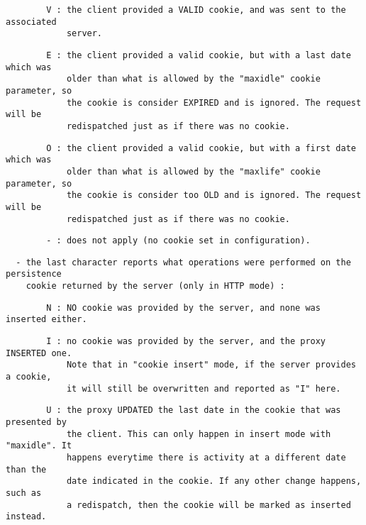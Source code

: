 \begin{verbatim}
        V : the client provided a VALID cookie, and was sent to the associated
            server.
\end{verbatim}

\begin{verbatim}
        E : the client provided a valid cookie, but with a last date which was
            older than what is allowed by the "maxidle" cookie parameter, so
            the cookie is consider EXPIRED and is ignored. The request will be
            redispatched just as if there was no cookie.
\end{verbatim}

\begin{verbatim}
        O : the client provided a valid cookie, but with a first date which was
            older than what is allowed by the "maxlife" cookie parameter, so
            the cookie is consider too OLD and is ignored. The request will be
            redispatched just as if there was no cookie.
\end{verbatim}

\begin{verbatim}
        - : does not apply (no cookie set in configuration).
\end{verbatim}

\begin{verbatim}
  - the last character reports what operations were performed on the persistence
    cookie returned by the server (only in HTTP mode) :
\end{verbatim}

\begin{verbatim}
        N : NO cookie was provided by the server, and none was inserted either.
\end{verbatim}

\begin{verbatim}
        I : no cookie was provided by the server, and the proxy INSERTED one.
            Note that in "cookie insert" mode, if the server provides a cookie,
            it will still be overwritten and reported as "I" here.
\end{verbatim}

\begin{verbatim}
        U : the proxy UPDATED the last date in the cookie that was presented by
            the client. This can only happen in insert mode with "maxidle". It
            happens everytime there is activity at a different date than the
            date indicated in the cookie. If any other change happens, such as
            a redispatch, then the cookie will be marked as inserted instead.
\end{verbatim}

